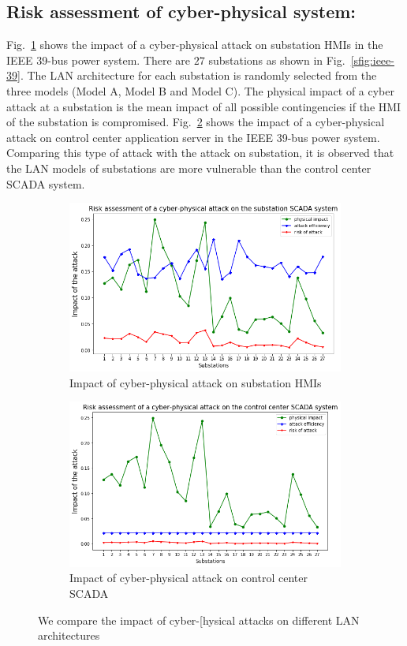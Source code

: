 \subsection{Risk assessment of cyber-physical system:} 
Fig.~\ref{sfig:impact1} shows the impact of a cyber-physical attack on substation HMIs in the IEEE 39-bus power system. There are $27$ substations as shown in Fig.~\ref{sfig:ieee-39}. The LAN architecture for each substation is randomly selected from the three models (Model A, Model B and Model C). The physical impact of a cyber attack at a substation is the mean impact of all possible contingencies if the HMI of the substation is compromised. Fig.~\ref{sfig:impact2} shows the impact of a cyber-physical attack on control center application server in the IEEE 39-bus power system. Comparing this type of attack with the attack on substation, it is observed that the LAN models of substations are more vulnerable than the control center SCADA system.
\begin{figure}[htbp]
	\centering
	\begin{subfigure}{0.48\textwidth}
	\centering
	\includegraphics[width=\textwidth]{fig-impact1.png}
	\caption{Impact of cyber-physical attack on substation HMIs}
	\label{sfig:impact1}
	\end{subfigure}
	\begin{subfigure}{0.48\textwidth}
	\centering
	\includegraphics[width=\textwidth]{fig-impact2.png}
	\caption{Impact of cyber-physical attack on control center SCADA}
	\label{sfig:impact2}
	\end{subfigure}
	\caption{We compare the impact of cyber-[hysical attacks on different LAN architectures}
	\label{fig:result-2}
\end{figure}


